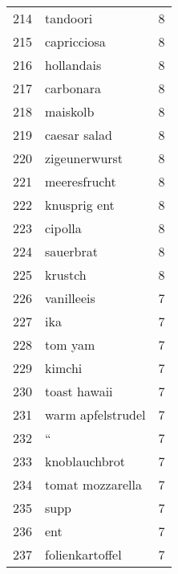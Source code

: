 \begin{tabular}{llr}
214  &                                           tandoori &      8 \\
215  &                                        capricciosa &      8 \\
216  &                                         hollandais &      8 \\
217  &                                          carbonara &      8 \\
218  &                                           maiskolb &      8 \\
219  &                                       caesar salad &      8 \\
220  &                                      zigeunerwurst &      8 \\
221  &                                       meeresfrucht &      8 \\
222  &                                       knusprig ent &      8 \\
223  &                                            cipolla &      8 \\
224  &                                          sauerbrat &      8 \\
225  &                                            krustch &      8 \\
226  &                                         vanilleeis &      7 \\
227  &                                                ika &      7 \\
228  &                                            tom yam &      7 \\
229  &                                             kimchi &      7 \\
230  &                                       toast hawaii &      7 \\
231  &                                  warm apfelstrudel &      7 \\
232  &                                                  “ &      7 \\
233  &                                      knoblauchbrot &      7 \\
234  &                                   tomat mozzarella &      7 \\
235  &                                               supp &      7 \\
236  &                                                ent &      7 \\
237  &                                    folienkartoffel &      7 \\

\end{tabular}
